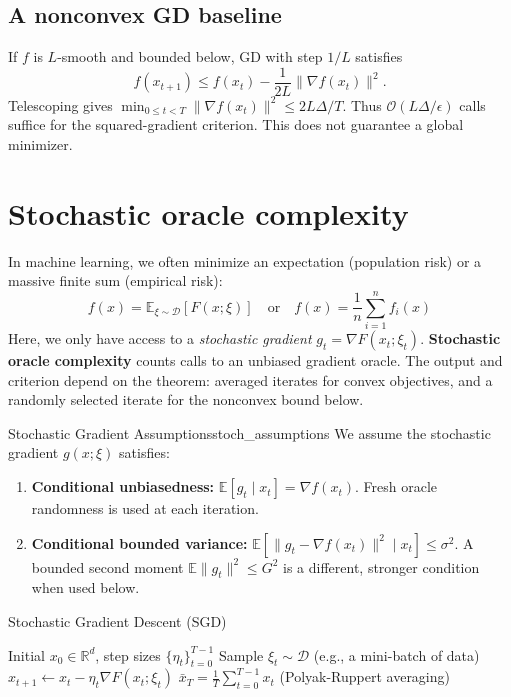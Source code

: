 \documentclass[11pt]{article}
\begin{document}
\subsection{A nonconvex GD baseline}
If $f$ is $L$-smooth and bounded below, GD with step $1/L$ satisfies
\[
f(x_{t+1})\le f(x_t)-\frac{1}{2L}\|\nabla f(x_t)\|^2.
\]
Telescoping gives $\min_{0\le t<T}\|\nabla f(x_t)\|^2\le 2L\Delta/T$. Thus $\mathcal O(L\Delta/\epsilon)$ calls suffice for the squared-gradient criterion. This does not guarantee a global minimizer.

\section{Stochastic oracle complexity}

In machine learning, we often minimize an expectation (population risk) or a massive finite sum (empirical risk):
\begin{equation}
    f(x) = \mathbb{E}_{\xi \sim \mathcal{D}}[F(x; \xi)] \quad \text{or} \quad f(x) = \frac{1}{n} \sum_{i=1}^n f_i(x)
\end{equation}
Here, we only have access to a \textit{stochastic gradient} $g_t = \nabla F(x_t; \xi_t)$. 
\textbf{Stochastic oracle complexity} counts calls to an unbiased gradient oracle. The output and criterion depend on the theorem: averaged iterates for convex objectives, and a randomly selected iterate for the nonconvex bound below. 

\begin{definition}{Stochastic Gradient Assumptions}{stoch_assumptions}
We assume the stochastic gradient $g(x; \xi)$ satisfies:
\begin{enumerate}
    \item \textbf{Conditional unbiasedness:} $\mathbb E[g_t\mid x_t]=\nabla f(x_t)$. Fresh oracle randomness is used at each iteration.
    \item \textbf{Conditional bounded variance:} $\mathbb E[\|g_t-\nabla f(x_t)\|^2\mid x_t]\le\sigma^2$. A bounded second moment $\mathbb E\|g_t\|^2\le G^2$ is a different, stronger condition when used below.
\end{enumerate}
\end{definition}

\begin{algobox}{Stochastic Gradient Descent (SGD)}
\begin{algorithmic}[1]
\Require Initial $x_0 \in \mathbb{R}^d$, step sizes $\{\eta_t\}_{t=0}^{T-1}$
    \State Sample $\xi_t \sim \mathcal{D}$ (e.g., a mini-batch of data)
    \State $x_{t+1} \gets x_t - \eta_t \nabla F(x_t; \xi_t)$
\EndFor
\Ensure $\bar{x}_T = \frac{1}{T}\sum_{t=0}^{T-1} x_t$ (Polyak-Ruppert averaging)
\end{algorithmic}
\end{algobox}
\end{document}
